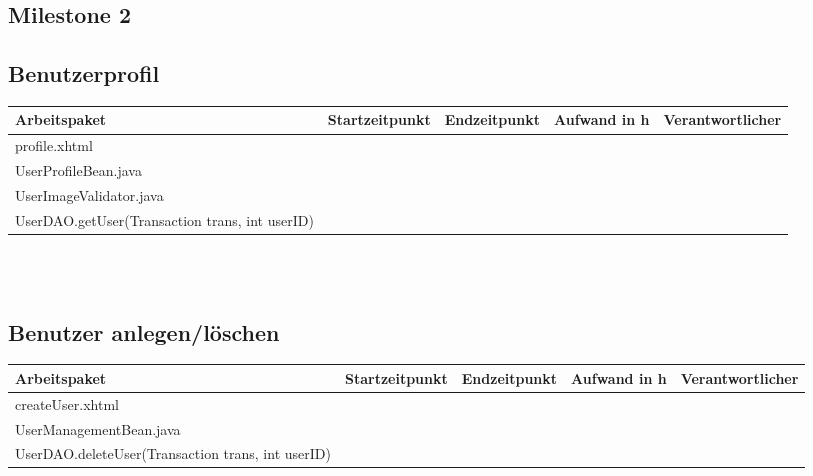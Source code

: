 \begin{landscape}
	\section{Milestone 2}
	
	\subsection{Benutzerprofil}
	\begin{tabular}{|p{10cm}|p{4cm}|p{3cm}|p{3cm}|p{3cm}|}
		\hline  \textbf{Arbeitspaket} & \textbf{Startzeitpunkt} & \textbf{Endzeitpunkt} & \textbf{Aufwand in h} & \textbf{Verantwortlicher} \\ 
		\hline   profile.xhtml                                         &                            &                             &                     &\\
		\hline   UserProfileBean.java                                  &                            &                             &                     &\\
		\hline   UserImageValidator.java                               &                            &                             &                     &\\ 
		\hline   UserDAO.getUser(Transaction trans, int userID)        &                            &                             &                     &\\ 
		\hline 
	\end{tabular} \ \\
	\ \\
	
	\subsection{Benutzer anlegen/löschen}
	\begin{tabular}{|p{10cm}|p{4cm}|p{3cm}|p{3cm}|p{3cm}|}
		\hline  \textbf{Arbeitspaket} & \textbf{Startzeitpunkt} & \textbf{Endzeitpunkt} & \textbf{Aufwand in h} & \textbf{Verantwortlicher} \\ 
		\hline   createUser.xhtml                                      &                            &                             &                     &\\
		\hline   UserManagementBean.java                               &                            &                             &                     &\\
		\hline   UserDAO.deleteUser(Transaction trans, int userID)     &                            &                             &                     &\\
		\hline 
	\end{tabular} \ \\
	\ \\
	

\end{landscape}
